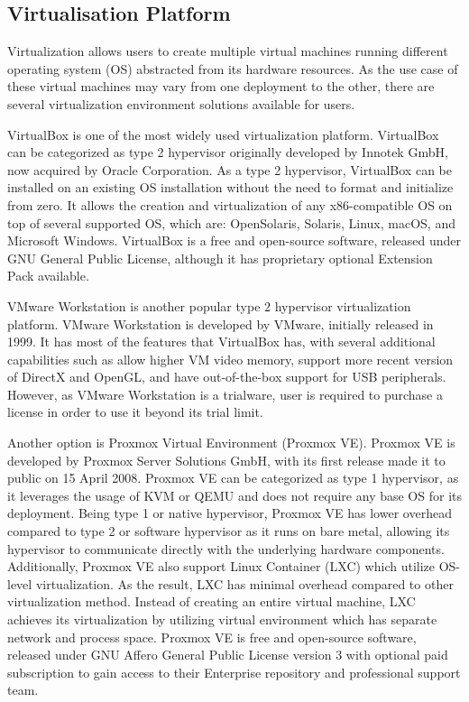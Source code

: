 \documentclass[../index.tex]{subfiles}
\begin{document}

\subsection{Virtualisation Platform}

Virtualization allows users to create multiple virtual machines running different operating system
(OS) abstracted from its hardware resources. As the use case of these virtual machines may vary from
one deployment to the other, there are several virtualization environment solutions available for
users.

VirtualBox is one of the most widely used virtualization platform. VirtualBox can be categorized as
type 2 hypervisor originally developed by Innotek GmbH, now acquired by Oracle Corporation. As a
type 2 hypervisor, VirtualBox can be installed on an existing OS installation without the need to
format and initialize from zero. It allows the creation and virtualization of any x86-compatible OS
on top of several supported OS, which are: OpenSolaris, Solaris, Linux, macOS, and Microsoft
Windows. VirtualBox is a free and open-source software, released under GNU General Public License,
although it has proprietary optional Extension Pack available.

VMware Workstation is another popular type 2 hypervisor virtualization platform. VMware Workstation
is developed by VMware, initially released in 1999. It has most of the features that VirtualBox has,
with several additional capabilities such as allow higher VM video memory, support more recent
version of DirectX and OpenGL, and have out-of-the-box support for USB peripherals. However, as
VMware Workstation is a trialware, user is required to purchase a license in order to use it beyond
its trial limit.

Another option is Proxmox Virtual Environment (Proxmox VE). Proxmox VE is developed by Proxmox
Server Solutions GmbH, with its first release made it to public on 15 April 2008. Proxmox VE can be
categorized as type 1 hypervisor, as it leverages the usage of KVM or QEMU and does not require any
base OS for its deployment. Being type 1 or native hypervisor, Proxmox VE has lower overhead
compared to type 2 or software hypervisor as it runs on bare metal, allowing its hypervisor to
communicate directly with the underlying hardware components. Additionally, Proxmox VE also support
Linux Container (LXC) which utilize OS- level virtualization. As the result, LXC has minimal
overhead compared to other virtualization method. Instead of creating an entire virtual machine, LXC
achieves its virtualization by utilizing virtual environment which has separate network and process
space. Proxmox VE is free and open-source software, released under GNU Affero General Public License
version 3 with optional paid subscription to gain access to their Enterprise repository and
professional support team.
\end{document}
